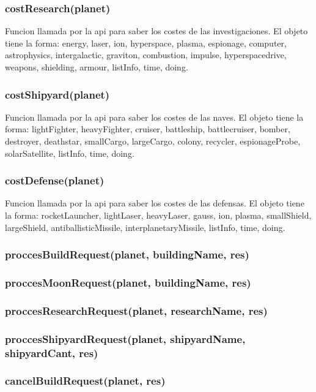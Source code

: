 \documentclass{article}
\begin{document}
        \subsubsection{costResearch(planet)}
            Funcion llamada por la api para saber los costes de las investigaciones. El objeto tiene la forma: energy, laser, ion, hyperspace, plasma, espionage, computer, astrophysics, intergalactic, graviton, combustion, impulse, hyperspacedrive, weapons, shielding, armour, listInfo, time, doing.
        \subsubsection{costShipyard(planet)}
            Funcion llamada por la api para saber los costes de las naves. El objeto tiene la forma: lightFighter, heavyFighter, cruiser, battleship, battlecruiser, bomber, destroyer, deathstar, smallCargo, largeCargo, colony, recycler, espionageProbe, solarSatellite, listInfo, time, doing.
        \subsubsection{costDefense(planet)}
            Funcion llamada por la api para saber los costes de las defensas. El objeto tiene la forma: rocketLauncher, lightLaser, heavyLaser, gauss, ion, plasma, smallShield, largeShield, antiballisticMissile, interplanetaryMissile, listInfo, time, doing.

        \subsubsection{proccesBuildRequest(planet, buildingName, res)}
        \subsubsection{proccesMoonRequest(planet, buildingName, res)}
        \subsubsection{proccesResearchRequest(planet, researchName, res)}
        \subsubsection{proccesShipyardRequest(planet, shipyardName, shipyardCant, res)}
        \subsubsection{cancelBuildRequest(planet, res)}
\end{document}
